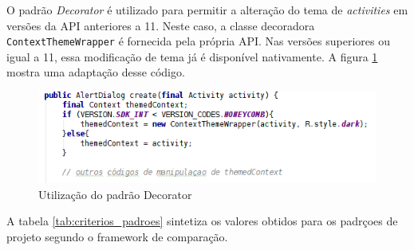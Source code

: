 O padrão \textit{Decorator} é utilizado para permitir a alteração do tema de
\textit{activities} em versões da API anteriores a 11. Neste caso, a classe decoradora
\texttt{ContextThemeWrapper} é fornecida pela própria API. Nas versões superiores
ou igual a 11, essa modificação de tema já é disponível nativamente.
A figura \ref{fig:decorator} mostra uma adaptação desse código.
\begin{figure}[ht]
\centering
\includegraphics[width=1\textwidth]{imagens/decorator.png}
\caption{Utilização do padrão Decorator}
\label{fig:decorator}
\end{figure}

A tabela \ref{tab:criterios_padroes} sintetiza os valores obtidos para os padrçoes de projeto segundo o 
framework de comparação. 

